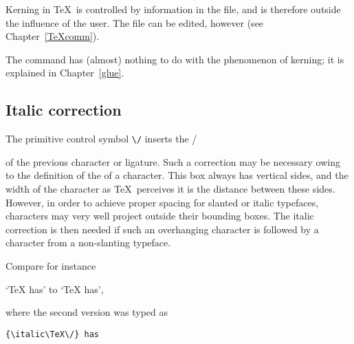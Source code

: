 Kerning in \TeX\ is controlled by information in the
 file, and is therefore outside the influence of the
user. The  file can be edited, however (see Chapter~\ref{TeXcomm}).

The  command has (almost) nothing to do with the
phenomenon of kerning; it is explained in Chapter~\ref{glue}.

\subsection{Italic correction}

The primitive control symbol \verb-\/- inserts the 
\cstoidx /\par
of the previous character or ligature.
Such a correction may be necessary owing to the definition
of the  of a character. This box always
has vertical sides, and the width of the character as \TeX\
perceives it is the distance between these sides.
However, in order to achieve proper spacing  for slanted or
italic typefaces, characters may very well project outside their
bounding boxes. The italic correction is then needed if
such an overhanging character is followed by a 
character from a non-slanting typeface.

Compare for instance
\begin{Disp} `{\italic\TeX} has'
to `{\italic\TeX\/} has',
\end{Disp} where the second version was typed as
\begin{verbatim}
{\italic\TeX\/} has
\end{verbatim}

